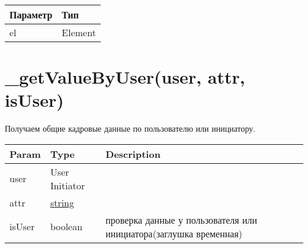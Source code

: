 \begin{longtable}[]{@{}ll@{}}
\toprule
Параметр & Тип\tabularnewline
\midrule
\endhead
el & Element\tabularnewline
\bottomrule
\end{longtable}

\hypertarget{getvaluebyuseruser-attr-isuser}{%
\section{\_getValueByUser(user, attr, isUser)}\label{getvaluebyuseruser-attr-isuser}}

Получаем общие кадровые данные по пользователю или инициатору.


\begin{longtable}[]{@{}lll@{}}
\toprule
\begin{minipage}[b]{0.30\columnwidth}\raggedright
Param\strut
\end{minipage} & \begin{minipage}[b]{0.30\columnwidth}\raggedright
Type\strut
\end{minipage} & \begin{minipage}[b]{0.30\columnwidth}\raggedright
Description\strut
\end{minipage}\tabularnewline
\midrule
\endhead
\begin{minipage}[t]{0.30\columnwidth}\raggedright
user\strut
\end{minipage} & \begin{minipage}[t]{0.30\columnwidth}\raggedright
User \textbar{} Initiator\strut
\end{minipage} & \begin{minipage}[t]{0.30\columnwidth}\raggedright
\strut
\end{minipage}\tabularnewline
\begin{minipage}[t]{0.30\columnwidth}\raggedright
attr\strut
\end{minipage} & \begin{minipage}[t]{0.30\columnwidth}\raggedright
\protect\hyperlink{string}{string}\strut
\end{minipage} & \begin{minipage}[t]{0.30\columnwidth}\raggedright
\strut
\end{minipage}\tabularnewline
\begin{minipage}[t]{0.30\columnwidth}\raggedright
isUser\strut
\end{minipage} & \begin{minipage}[t]{0.30\columnwidth}\raggedright
boolean\strut
\end{minipage} & \begin{minipage}[t]{0.30\columnwidth}\raggedright
проверка данные у пользователя или инициатора(заглушка временная)\strut
\end{minipage}\tabularnewline
\bottomrule
\end{longtable}

